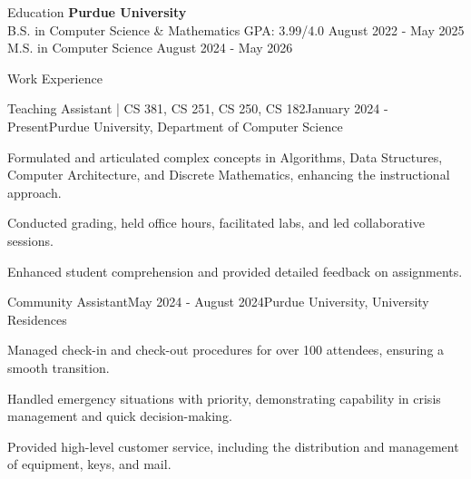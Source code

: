\documentclass[
    11pt, %
]{resume} %
\begin{document}
\small

\vspace*{-0.3cm}
\begin{rSection}{Education}
\vspace*{-0.3cm}
    \textbf{Purdue University} \\
    B.S. in Computer Science \& Mathematics \hfill GPA: 3.99/4.0 \quad August 2022 - May 2025 \\
    M.S. in Computer Science \hfill August 2024 - May 2026 \\
\end{rSection}
\vspace*{-0.3cm}
\begin{rSection}{Work Experience}
\vspace*{-0.2cm}
    \begin{rSubsection}{Teaching Assistant | CS 381, CS 251, CS 250, CS 182}{January 2024 - Present}{Purdue University, Department of Computer Science}{}
        \item Formulated and articulated complex concepts in Algorithms, Data Structures, Computer Architecture, and Discrete Mathematics, enhancing the instructional approach.
        \item Conducted grading, held office hours, facilitated labs, and led collaborative sessions.
        \item Enhanced student comprehension and provided detailed feedback on assignments.
    \end{rSubsection}
    \vspace*{0,3cm}
    
\begin{rSubsection}{Community Assistant}{May 2024 - August 2024}{Purdue University, University Residences}{}
    \item Managed check-in and check-out procedures for over 100 attendees, ensuring a smooth transition.
    \item Handled emergency situations with priority, demonstrating capability in crisis management and quick decision-making.
    \item Provided high-level customer service, including the distribution and management of equipment, keys, and mail.
\end{rSubsection}

\end{rSection}
\end{document}

